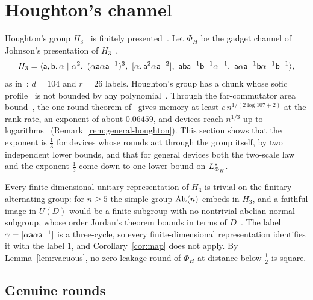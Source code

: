 \section{Houghton's channel}\label{sec:houghton}

Houghton's group $H_3$~\cite{Houghton1978} is finitely presented~\cite{Brown1987}.
Let $\Phi_H$ be the gadget channel of Johnson's presentation of $H_3$~\cite{Johnson1999},
\[
H_3=\langle\sfa,\sfb,\alpha\mid \alpha^2,\ (\alpha\sfa\alpha\sfa^{-1})^3,\ [\alpha,\sfa^2\alpha\sfa^{-2}],\ \sfa\sfb\sfa^{-1}\sfb^{-1}\alpha^{-1},\
\sfa\alpha\sfa^{-1}\sfb\alpha^{-1}\sfb^{-1}\rangle ,
\]
as in~\cite[Section~4]{DouglasMghirbiB}: $d=104$ and $r=26$ labels. Houghton's group has a chunk whose sofic profile~\cite[Definition~3.4]{Cornulier2013} is not bounded by any
polynomial~\cite[Theorem~1.1 and Corollary~1.2]{DouglasMghirbiA}. Through
the far-commutator area bound~\cite[Theorem~3.2]{DouglasMghirbiA}, the one-round theorem of~\cite{DouglasMghirbiB} gives memory at least $c\,n^{1/(2\log107+2)}$ at the rank rate, an exponent of about $0.06459$,
and devices reach $n^{1/3}$ up to logarithms~\cite[Corollary~6.7]{DouglasMghirbiB} (Remark~\ref{rem:general-houghton}). This section shows that the exponent is $\frac13$ for devices whose rounds act through the group
itself, by two independent lower bounds, and that for general devices both the two-scale law and the exponent $\frac13$ come down to one lower
bound on $L^{*}_{\Phi_H}$.

\begin{remark}\label{rem:houghton-map}
Every finite-dimensional unitary representation of $H_3$ is trivial on the finitary alternating group: for $n\ge5$ the simple group $\operatorname{Alt}(n)$
embeds in $H_3$, and a faithful image in $U(D)$ would be a finite subgroup with no nontrivial abelian normal subgroup, whose order Jordan's
theorem bounds in terms of $D$~\cite{Jordan1878}. The label $\gamma=[\alpha\mathsf a\alpha\mathsf a^{-1}]$ is a three-cycle, so every finite-dimensional
representation identifies it with the label $1$, and Corollary~\ref{cor:map} does not apply. By Lemma~\ref{lem:vacuous}, no zero-leakage round of
$\Phi_H$ at distance below $\frac12$ is square.
\end{remark}

\subsection{Genuine rounds}

